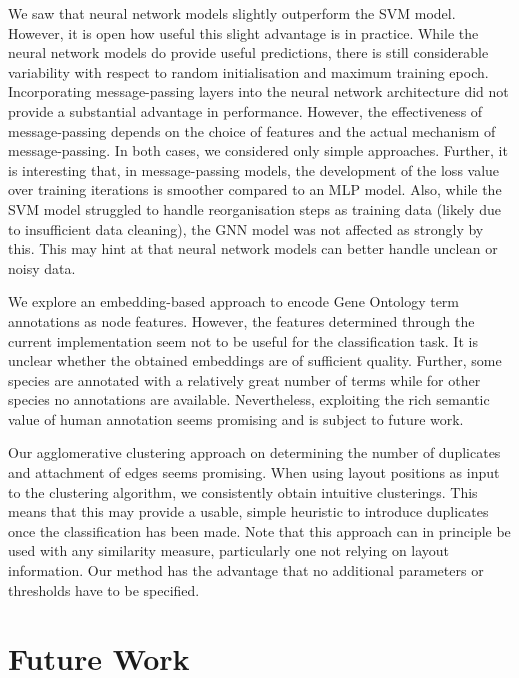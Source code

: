 \documentclass[
	fontsize=10pt, %
	twoside=true, %
	secnumdepth=1, %
  toc=indentunnumbered %
]{kaobook}
\begin{document}
We saw that neural network models slightly outperform the SVM model.
However, it is open how useful this slight advantage is in practice.
While the neural network models do provide useful predictions, there is still
considerable variability with respect to random initialisation and maximum
training epoch.
%
Incorporating message-passing layers into the neural network architecture did
not provide a substantial advantage in performance. However, the effectiveness
of message-passing depends on the choice of features and the actual mechanism of
message-passing. In both cases, we considered only simple approaches. Further,
it is interesting that, in message-passing models, the development of the loss
value over training iterations is smoother compared to an MLP model.
%
Also, while the SVM model struggled to handle reorganisation steps as training data
(likely due to insufficient data cleaning), the GNN model was not affected as
strongly by this. This may hint at that neural network models can better handle
unclean or noisy data.

We explore an embedding-based approach to encode Gene Ontology term annotations
as node features. However, the features determined through the current
implementation seem not to be useful for the classification task. It is unclear
whether the obtained embeddings are of sufficient quality. Further, some species
are annotated with a relatively great number of terms while for other species no
annotations are available. Nevertheless, exploiting the rich semantic value of
human annotation seems promising and is subject to future work.

Our agglomerative clustering approach on determining the number of duplicates
and attachment of edges seems promising. When using layout positions as input to
the clustering algorithm, we consistently obtain intuitive clusterings. This
means that this may provide a usable, simple heuristic to introduce duplicates
once the classification has been made. Note that this approach can in principle
be used with any similarity measure, particularly one not relying on layout
information. Our method has the advantage that no additional parameters or
thresholds have to be specified. 





\section{Future Work}
\label{sec:future-work}
\end{document}
